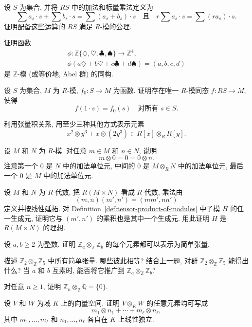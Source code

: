 \BookExerciseHeading
\begin{BookExercises}
  \item\label{ex:free-module-operations-satisfy-module-axioms} 设 $S$ 为集合, 并将 $RS$ 中的加法和标量乘法定义为
  \[
    \sum a_{s}\cdot s+\sum b_{s}\cdot s=\sum(a_{s}+b_{s})\cdot s
    \quad\text{且}\quad r\sum a_{s}\cdot s=\sum(ra_{s})\cdot s.
  \]
  证明配备这些运算的 $RS$ 满足 $R$-模的公理.
  \item\label{ex:free-module-on-suits-is-z-four} 证明函数
  \[
    \begin{gathered}
      \phi:\mathbb{Z}\{\diamondsuit,\heartsuit,\clubsuit,\spadesuit\}\to\mathbb{Z}^{4},\\
      \phi(a\diamondsuit+b\heartsuit+c\clubsuit+d\spadesuit)=(a,b,c,d)
    \end{gathered}
  \]
  是 $\mathbb{Z}$-模 (或等价地, Abel 群) 的同构.
  \item\label{ex:free-module-linear-extension} 设 $S$ 为集合, $M$ 为 $R$-模, $f_{0}:S\to M$ 为函数. 证明存在唯一 $R$-模同态 $f:RS\to M$, 使得
  \[
    f(1\cdot s)=f_{0}(s)\quad\text{对所有 }s\in S.
  \]
  \item\label{ex:rewrite-tensor-in-three-ways} 利用张量积关系, 用至少三种其他方式表示元素
  \[
    x^{2}\otimes y^{3}+x\otimes(2y^{3})\in R[x]\otimes_{R}R[y].
  \]
  \item\label{ex:tensor-with-zero-is-zero} 设 $M$ 和 $N$ 为 $R$-模. 对任意 $m\in M$ 和 $n\in N$, 说明
  \[
    m\otimes0=0=0\otimes n.
  \]
  注意第一个 $0$ 是 $N$ 中的加法单位元, 中间的 $0$ 是 $M\otimes_{R}N$ 中的加法单位元, 最后一个 $0$ 是 $M$ 中的加法单位元.
  \item\label{ex:tensor-product-relations-generate-ideal} 设 $M$ 和 $N$ 为 $R$-代数, 把 $R(M\times N)$ 看成 $R$-代数, 乘法由
  \[
    (m,n)(m',n')=(mm',nn')
  \]
  定义并按线性延拓. 对 Definition~\ref{def:tensor-product-of-modules} 中子模 $H$ 的任一生成元, 证明它与 $(m',n')$ 的乘积也是其中一个生成元. 用此证明 $H$ 是 $R(M\times N)$ 的理想.
  \item\label{ex:tensor-product-of-cyclic-modules-only-simple-tensors} 设 $a,b\geq2$ 为整数. 证明 $\mathbb{Z}_{a}\otimes_{\mathbb{Z}}\mathbb{Z}_{b}$ 的每个元素都可以表示为简单张量.
  \item\label{ex:tensor-product-of-coprime-cyclic-modules} 描述 $\mathbb{Z}_{2}\otimes_{\mathbb{Z}}\mathbb{Z}_{5}$ 中所有简单张量. 哪些彼此相等? 结合上一题, 对群 $\mathbb{Z}_{2}\otimes_{\mathbb{Z}}\mathbb{Z}_{5}$ 能得出什么? 当 $a$ 和 $b$ 互素时, 能否将它推广到 $\mathbb{Z}_{a}\otimes_{\mathbb{Z}}\mathbb{Z}_{b}$?
  \item\label{ex:finite-cyclic-tensor-rationals-is-zero} 对任意 $n\geq1$, 证明 $\mathbb{Z}_{n}\otimes_{\mathbb{Z}}\mathbb{Q}=\{0\}$.
  \item\label{ex:tensor-sum-with-independent-factor-lists} 设 $V$ 和 $W$ 为域 $K$ 上的向量空间. 证明 $V\otimes_{K}W$ 的任意元素均可写成
  \[
    m_{1}\otimes n_{1}+\cdots+m_{\ell}\otimes n_{\ell},
  \]
  其中 $m_{1},\ldots,m_{\ell}$ 和 $n_{1},\ldots,n_{\ell}$ 各自在 $K$ 上线性独立.
\end{BookExercises}
